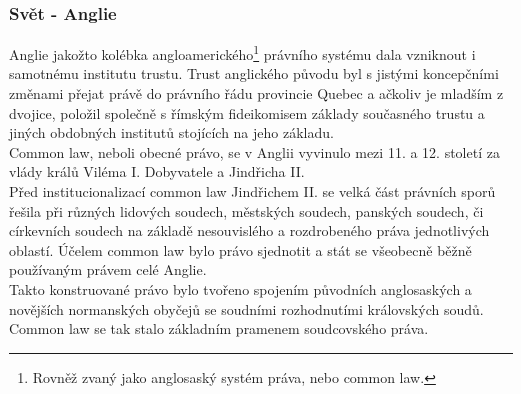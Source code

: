 \documentclass{article}
\begin{document}
\subsubsection{Svět - Anglie}

Anglie jakožto kolébka angloamerického\footnote{Rovněž zvaný jako anglosaský systém práva, nebo common law.} právního systému dala vzniknout i samotnému institutu trustu. Trust anglického původu byl s jistými koncepčními změnami přejat právě do právního řádu provincie Quebec a ačkoliv je mladším z dvojice, položil společně s římským fideikomisem základy současného trustu a jiných obdobných institutů stojících na jeho základu.\\




Common law, neboli obecné právo, se v Anglii vyvinulo mezi 11. a 12. století za vlády králů Viléma I. Dobyvatele a Jindřicha II.\\

Před institucionalizací common law Jindřichem II. se velká část právních sporů řešila při různých lidových soudech, městských soudech, panských soudech, či církevních soudech na základě nesouvislého a rozdrobeného práva jednotlivých oblastí. Účelem common law bylo právo sjednotit a stát se všeobecně běžně používaným právem celé Anglie.\\

Takto konstruované právo bylo tvořeno spojením původních anglosaských a novějších normanských obyčejů se soudními rozhodnutími královských soudů. Common law se tak stalo základním pramenem soudcovského práva.\\
\end{document}
